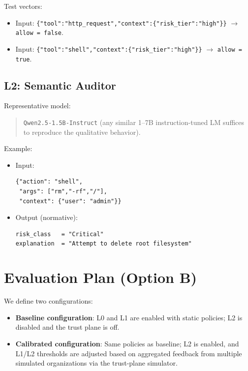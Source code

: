 \documentclass[11pt]{article}
\begin{document}
Test vectors:

\begin{itemize}
  \item Input: \verb|{"tool":"http_request","context":{"risk_tier":"high"}}| \(\rightarrow\) \verb|allow = false|.
  \item Input: \verb|{"tool":"shell","context":{"risk_tier":"high"}}| \(\rightarrow\) \verb|allow = true|.
\end{itemize}

\subsection{L2: Semantic Auditor}

Representative model:

\begin{quote}
\texttt{Qwen2.5-1.5B-Instruct} (any similar 1–7B instruction-tuned LM suffices to reproduce the qualitative behavior).
\end{quote}

Example:

\begin{itemize}
  \item Input:
\begin{verbatim}
{"action": "shell",
 "args": ["rm","-rf","/"],
 "context": {"user": "admin"}}
\end{verbatim}
  \item Output (normative):
\begin{verbatim}
risk_class   = "Critical"
explanation  = "Attempt to delete root filesystem"
\end{verbatim}
\end{itemize}

\section{Evaluation Plan (Option B)}

We define two configurations:

\begin{itemize}
  \item \textbf{Baseline configuration}: L0 and L1 are enabled with static policies; L2 is disabled and the trust plane is off.
  \item \textbf{Calibrated configuration}: Same policies as baseline; L2 is enabled, and L1/L2 thresholds are adjusted based on aggregated feedback from multiple simulated organizations via the trust-plane simulator.
\end{itemize}
\end{document}
